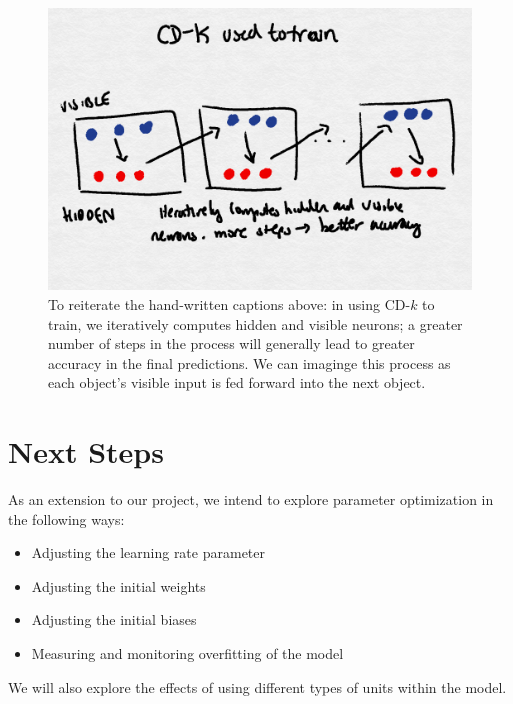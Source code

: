 \documentclass[12pt]{article}
\begin{document}
\begin{figure}
  \centerline{\includegraphics[scale=0.3]{cdk-1.png}}
  \caption{To reiterate the hand-written captions above: in using CD-$k$ to train, we iteratively computes hidden and visible neurons; a greater number of steps in the process will generally lead to greater accuracy in the final predictions. We can imaginge this process as each object's visible input is fed forward into the next object. }
\end{figure}

\section{Next Steps}

As an extension to our project, we intend to explore parameter optimization in the following ways:
\begin{itemize}
  \item Adjusting the learning rate parameter
  \item Adjusting the initial weights 
  \item Adjusting the initial biases
  \item Measuring and monitoring overfitting of the model
\end{itemize}

We will also explore the effects of using different types of units within the model. 
\end{document}
